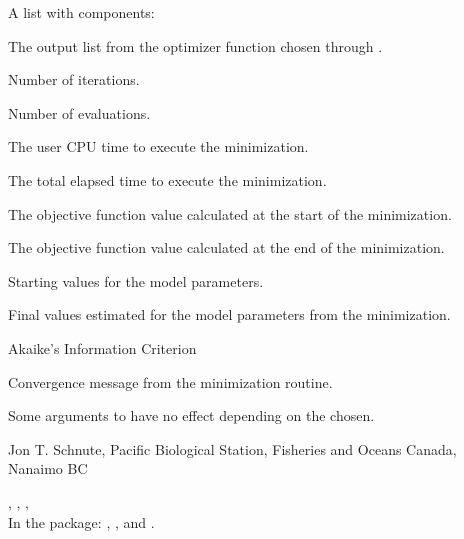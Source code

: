\documentclass[letterpaper]{book}
\begin{document}
%
\begin{Value}
A list with components:
\begin{ldescription}
\item[\code{Fout}] The output list from the optimizer function chosen through .
\item[\code{iters}] Number of iterations.
\item[\code{evals}] Number of evaluations.
\item[\code{cpuTime}] The user CPU time to execute the minimization.
\item[\code{elapTime}] The total elapsed time to execute the minimization.
\item[\code{fminS}] The objective function value calculated at the start of the minimization.
\item[\code{fminE}] The objective function value calculated at the end of the minimization.
\item[\code{Pstart}] Starting values for the model parameters.
\item[\code{Pend}] Final values estimated for the model parameters from the minimization.
\item[\code{AIC}] Akaike's Information Criterion
\item[\code{message}] Convergence message from the minimization routine.
\end{ldescription}
\end{Value}
%
\begin{Note}\relax
Some arguments to  have no effect depending on the  chosen.
\end{Note}
%
\begin{Author}\relax
Jon T. Schnute, Pacific Biological Station, Fisheries and Oceans Canada, Nanaimo BC
\end{Author}
%
\begin{SeeAlso}\relax
{}, , ,  \\{}
In the  package: , , and .
\end{SeeAlso}
%
\end{document}
